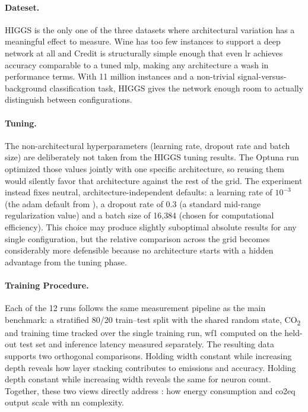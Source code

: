\paragraph{Dateset.}
HIGGS is the only one of the three datasets where architectural variation has a meaningful effect to measure. Wine has too few instances to support a deep network at all and Credit is structurally simple enough that even \gls{lr} achieves accuracy comparable to a tuned \gls{mlp}, making any architecture a wash in performance terms. With 11 million instances and a non-trivial signal-versus-background classification task, HIGGS gives the network enough room to actually distinguish between configurations.

\paragraph{Tuning.}
The non-architectural hyperparameters (learning rate, dropout rate and batch size) are deliberately not taken from the HIGGS tuning results. The Optuna run optimized those values jointly with one specific architecture, so reusing them would silently favor that architecture against the rest of the grid. The experiment instead fixes neutral, architecture-independent defaults: a learning rate of $10^{-3}$ (the \gls{adam} default from \citeauthor{kingmaAdamMethodStochastic2015} \cite{kingmaAdamMethodStochastic2015}), a dropout rate of $0.3$ (a standard mid-range regularization value) and a batch size of 16{,}384 (chosen for computational efficiency). This choice may produce slightly suboptimal absolute results for any single configuration, but the relative comparison across the grid becomes considerably more defensible because no architecture starts with a hidden advantage from the tuning phase.

\paragraph{Training Procedure.}
Each of the 12 runs follows the same measurement pipeline as the main benchmark: a stratified 80/20 train--test split with the shared random state, CO\textsubscript{2} and training time tracked over the single training run, \gls{wf1} computed on the held-out test set and inference latency measured separately. The resulting data supports two orthogonal comparisons. Holding width constant while increasing depth reveals how layer stacking contributes to emissions and accuracy. Holding depth constant while increasing width reveals the same for neuron count. Together, these two views directly address : how energy consumption and \gls{co2eq} output scale with \gls{nn} complexity.

